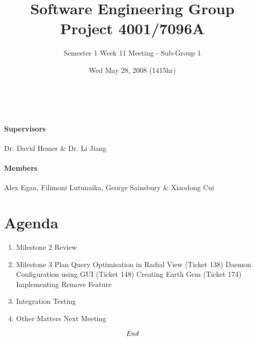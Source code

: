 \documentclass[10pt, a4]{article}
\begin{document}
\title{Software Engineering Group Project 4001/7096A}
\author{Semester 1 Week 11 Meeting - Sub-Group 1}
\date{Wed May 28, 2008 (1415hr)}

\maketitle
 
\\ 

\paragraph{Supervisors} Dr. David Hemer \& Dr. Li Jiang

\paragraph{Members} Alex Egan, Filimoni Lutunaika, George Sainsbury \& Xiaodong Cui

\section*{Agenda}

\begin{enumerate}
\item Milestone 2 Review

\item Milestone 3 Plan
\subitem Query Optimisation in Radial View (Ticket 138)
\subitem Daemon Configuration using GUI (Ticket 148)
\subitem Creating Earth Gem (Ticket 174)
\subitem Implementing Remove Feature 

\item Integration Testing

\item Other Matters
\subitem Next Meeting


\end{enumerate}

\[\emph{End}\]
\end{document}
